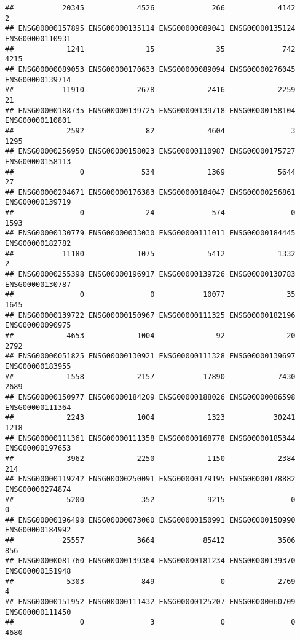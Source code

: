\documentclass[
]{article}
\begin{document}
\begin{verbatim}
##           20345            4526             266            4142               2 
## ENSG00000157895 ENSG00000135114 ENSG00000089041 ENSG00000135124 ENSG00000110931 
##            1241              15              35             742            4215 
## ENSG00000089053 ENSG00000170633 ENSG00000089094 ENSG00000276045 ENSG00000139714 
##           11910            2678            2416            2259              21 
## ENSG00000188735 ENSG00000139725 ENSG00000139718 ENSG00000158104 ENSG00000110801 
##            2592              82            4604               3            1295 
## ENSG00000256950 ENSG00000158023 ENSG00000110987 ENSG00000175727 ENSG00000158113 
##               0             534            1369            5644              27 
## ENSG00000204671 ENSG00000176383 ENSG00000184047 ENSG00000256861 ENSG00000139719 
##               0              24             574               0            1593 
## ENSG00000130779 ENSG00000033030 ENSG00000111011 ENSG00000184445 ENSG00000182782 
##           11180            1075            5412            1332               2 
## ENSG00000255398 ENSG00000196917 ENSG00000139726 ENSG00000130783 ENSG00000130787 
##               0               0           10077              35            1645 
## ENSG00000139722 ENSG00000150967 ENSG00000111325 ENSG00000182196 ENSG00000090975 
##            4653            1004              92              20            2792 
## ENSG00000051825 ENSG00000130921 ENSG00000111328 ENSG00000139697 ENSG00000183955 
##            1558            2157           17890            7430            2689 
## ENSG00000150977 ENSG00000184209 ENSG00000188026 ENSG00000086598 ENSG00000111364 
##            2243            1004            1323           30241            1218 
## ENSG00000111361 ENSG00000111358 ENSG00000168778 ENSG00000185344 ENSG00000197653 
##            3962            2250            1150            2384             214 
## ENSG00000119242 ENSG00000250091 ENSG00000179195 ENSG00000178882 ENSG00000274874 
##            5200             352            9215               0               0 
## ENSG00000196498 ENSG00000073060 ENSG00000150991 ENSG00000150990 ENSG00000184992 
##           25557            3664           85412            3506             856 
## ENSG00000081760 ENSG00000139364 ENSG00000181234 ENSG00000139370 ENSG00000151948 
##            5303             849               0            2769               4 
## ENSG00000151952 ENSG00000111432 ENSG00000125207 ENSG00000060709 ENSG00000111450 
##               0               3               0               0            4680 

\end{verbatim}
\end{document}
